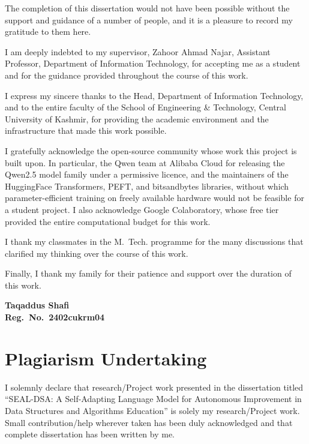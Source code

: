 \documentclass[12pt,a4paper]{report}
\begin{document}
The completion of this dissertation would not have been possible without the support and guidance of a number of people, and it is a pleasure to record my gratitude to them here.

I am deeply indebted to my supervisor, Zahoor Ahmad Najar, Assistant Professor, Department of Information Technology, for accepting me as a student and for the guidance provided throughout the course of this work.

I express my sincere thanks to the Head, Department of Information Technology, and to the entire faculty of the School of Engineering \& Technology, Central University of Kashmir, for providing the academic environment and the infrastructure that made this work possible.

I gratefully acknowledge the open-source community whose work this project is built upon. In particular, the Qwen team at Alibaba Cloud for releasing the Qwen2.5 model family under a permissive licence, and the maintainers of the HuggingFace Transformers, PEFT, and bitsandbytes libraries, without which parameter-efficient training on freely available hardware would not be feasible for a student project. I also acknowledge Google Colaboratory, whose free tier provided the entire computational budget for this work.

I thank my classmates in the M.~Tech. programme for the many discussions that clarified my thinking over the course of this work.

Finally, I thank my family for their patience and support over the duration of this work.

\vspace{1cm}

\noindent\textbf{Taqaddus Shafi}\\
\textbf{Reg.~No.~2402cukrm04}
\endgroup

\clearpage

\chapter*{Plagiarism Undertaking}
\begingroup
\singlespacing

I solemnly declare that research/Project work presented in the dissertation titled ``SEAL-DSA: A Self-Adapting Language Model for Autonomous Improvement in Data Structures and Algorithms Education'' is solely my research/Project work. Small contribution/help wherever taken has been duly acknowledged and that complete dissertation has been written by me.
\end{document}
